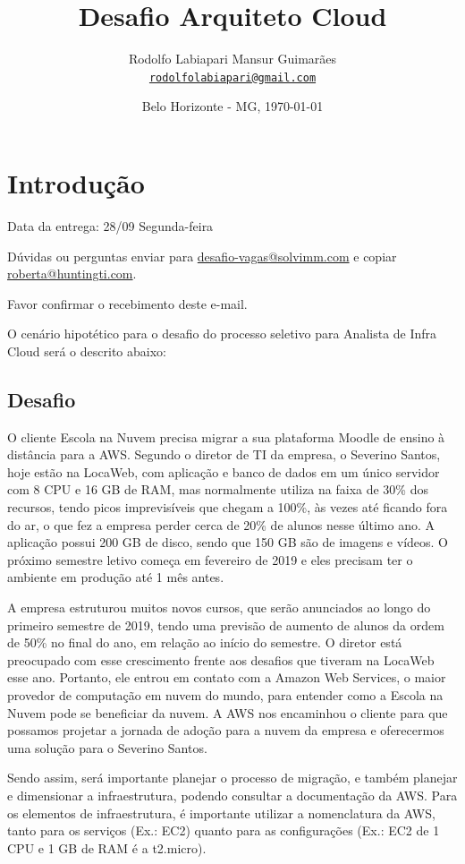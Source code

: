 \documentclass{article}
\title{Desafio Arquiteto Cloud}
\author{Rodolfo Labiapari Mansur Guimarães \\\href{mailto:rodolfolabiapari@gmail.com}{\texttt{rodolfolabiapari@gmail.com}}}
\date{Belo Horizonte - MG, \today}
\begin{document}
\maketitle

\section{Introdução}

Data da entrega: 28/09 Segunda-feira

Dúvidas ou perguntas enviar para \href{mailto:desafio-vagas@solvimm.com}{desafio-vagas@solvimm.com} e copiar \\\href{mailto:roberta@huntingti.com}{roberta@huntingti.com}.

Favor confirmar o recebimento deste e-mail.

O cenário hipotético para o desafio do processo seletivo para Analista de Infra Cloud será o descrito abaixo:

\subsection{Desafio}
O cliente Escola na Nuvem precisa migrar a sua plataforma Moodle de ensino à distância para a AWS. Segundo o diretor de TI da empresa, o Severino Santos, hoje estão na LocaWeb, com aplicação e banco de dados em um único servidor com 8 CPU e 16 GB de RAM, mas normalmente utiliza na faixa de 30\% dos recursos, tendo picos imprevisíveis que chegam a 100\%, às vezes até ficando fora do ar, o que fez a empresa perder cerca de 20\% de alunos nesse último ano. A aplicação possui 200 GB de disco, sendo que 150 GB são de imagens e vídeos. O próximo semestre letivo começa em fevereiro de 2019 e eles precisam ter o ambiente em produção até 1 mês antes.

A empresa estruturou muitos novos cursos, que serão anunciados ao longo do primeiro semestre de 2019, tendo uma previsão de aumento de alunos da ordem de 50\% no final do ano, em relação ao início do semestre. O diretor está preocupado com esse crescimento frente aos desafios que tiveram na LocaWeb esse ano. Portanto, ele entrou em contato com a Amazon Web Services, o maior provedor de computação em nuvem do mundo, para entender como a Escola na Nuvem pode se beneficiar da nuvem. A AWS nos encaminhou o cliente para que possamos projetar a jornada de adoção para a nuvem da empresa e oferecermos uma solução para o Severino Santos.

Sendo assim, será importante planejar o processo de migração, e também planejar e dimensionar a infraestrutura, podendo consultar a documentação da AWS. Para os elementos de infraestrutura, é importante utilizar a nomenclatura da AWS, tanto para os serviços (Ex.: EC2) quanto para as configurações (Ex.: EC2 de 1 CPU e 1 GB de RAM é a t2.micro).
\end{document}
